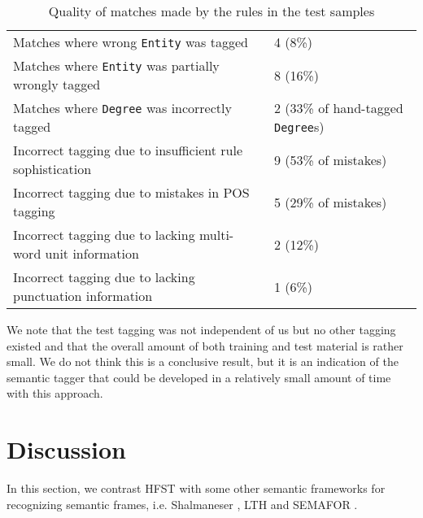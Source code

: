 \documentclass{llncs}
\begin{document}
\begin{table}[h]
  \centering
  \begin{tabular}{ l | l }
    \hline
    Matches where wrong \verb+Entity+ was tagged & 4 (8\%) \\
    Matches where \verb+Entity+ was partially wrongly tagged & 8 (16\%) \\
    Matches where \verb+Degree+ was incorrectly tagged & 2 (33\% of hand-tagged \verb+Degree+s) \\
    Incorrect tagging due to insufficient rule sophistication & 9 (53\% of mistakes) \\
    Incorrect tagging due to mistakes in POS tagging & 5 (29\% of mistakes) \\
    Incorrect tagging due to lacking multi-word unit information & 2 (12\%) \\
    Incorrect tagging due to lacking punctuation information & 1 (6\%) \\
    \hline
  \end{tabular}
  \caption{Quality of matches made by the rules in the test samples}
  \label{framequality}
\end{table}

We note that the test tagging was not independent of us but no other tagging existed and that
the overall amount of both training and test material is rather small. We do not think this is a conclusive result,
but it is an indication of the semantic tagger that could be developed in a relatively small amount of time with this approach.

\section{Discussion}
In this section, we contrast HFST with some other semantic frameworks for recognizing semantic frames, 
i.e. Shalmaneser \cite{Erk2006}, LTH \cite{Johansson2007} and SEMAFOR \cite{Das2014}.
\end{document}
